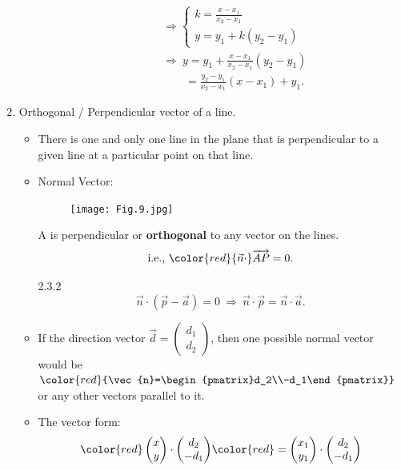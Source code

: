 \documentclass[12pt, a4paper]{article}
\def\d{{\mathrm{d}}}
\begin{document}
\begin{enumerate}
\begin{itemize}
\begin{enumerate}
$$\begin{aligned}
        &\Rightarrow \begin{cases}k=\frac{x-x_1}{x_2-x_1}\\y=y_1+k(y_2-y_1)\end{cases}\\
        &\Rightarrow\ y=y_1+\frac{x-x_1}{x_2-x_1}(y_2-y_1)\\
        &\ \ \ \ \ \ \ \ \ =\frac{y_2-y_1}{x_2-x_1}(x-x_1)+y_1.
      \end{aligned}$$
    \end{enumerate}
  \end{itemize}
  \item Orthogonal / Perpendicular vector of a line. 
  \begin{itemize}
    \item There is one and only one line in the plane that is perpendicular to a given line at a particular point on that line. 
    \item Normal Vector: 
    \begin{myclaim}{ }{}
      \begin{figure}[H]
        \centering
        \texttt{[image: Fig.9.jpg]}
      \end{figure}
      A \textbf{\color{red}{normal vector}} is perpendicular or \textbf{orthogonal} to any vector on the lines. 
      $$\text{i.e., }{\color{red}{\vec{n}\cdot}\overrightarrow{AP}=0}.$$
    \end{myclaim}
    \begin{theorem}{2.3.2}{}
    $$\vec{n}\cdot\left(\vec{p}-\vec{a}\right)=0\ \Rightarrow\ \vec{n}\cdot\vec{p}=\vec{n}\cdot\vec{a}.$$
    \end{theorem}
    \item If the direction vector $\vec{d}=\begin{pmatrix}d_1\\d_2\end{pmatrix}$, then one possible normal vector would be ${\color{red}{\vec{n}=\begin{pmatrix}d_2\\-d_1\end{pmatrix}}}$ or any other vectors parallel to it. 
    \item The vector form: 
    $$\begin{aligned}
      \color{red} \begin{pmatrix}x\\y\end{pmatrix}\cdot\begin{pmatrix}d_2\\-d_1\end{pmatrix}&\color{red}=\begin{pmatrix}x_1\\y_1\end{pmatrix}\cdot\begin{pmatrix}d_2\\-d_1\end{pmatrix}\\

\end{aligned}$$
\end{itemize}
\end{enumerate}
\end{document}
